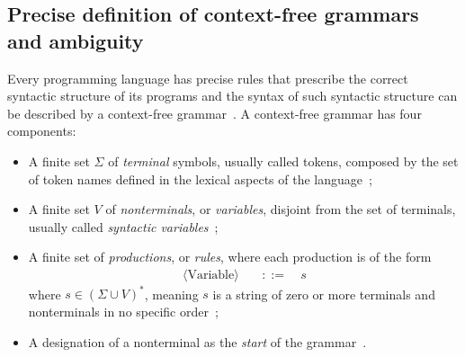 \documentclass[
  oneside,
  english,
  coorientadorbanca,
  embeddedlogo,
  noabntexcite
]{ufsc-thesis-rn46-2019}
\newcommand{\bnfvars}[1]{\langle\textrm{#1}\rangle}
\newcommand{\bnfprod}[2]{\bnfvars{#1} &\ &::= & #2}
\begin{document}
\subsection{Precise definition of context-free grammars and ambiguity}
Every programming language has precise rules that prescribe the correct syntactic structure of its programs and the syntax of such syntactic structure can be described by a context-free grammar~\cite{Aho:2006:CPT:1177220}.
A context-free grammar has four components:
\begin{itemize}
  \item A finite set $\Sigma$ of \textit{terminal} symbols, usually called tokens, composed by the set of token names defined in the lexical aspects of the language~\cite{Aho:2006:CPT:1177220};
  \item A finite set $V$ of \textit{nonterminals}, or \textit{variables}, disjoint from the set of terminals, usually called \textit{syntactic variables}~\cite{Aho:2006:CPT:1177220};
  \item A finite set of \textit{productions}, or \textit{rules}, where each production is of the form
        \begin{equation*}
          \begin{alignedat}{2}
            \bnfprod{Variable}{\ s}
          \end{alignedat}
        \end{equation*}
        where $s \in {(\Sigma \cup V)}^*$, meaning $s$ is a string of zero or more terminals and nonterminals in no specific order~\cite{Aho:2006:CPT:1177220, sipser2012introduction};
  \item A designation of a nonterminal as the \textit{start} of the grammar~\cite{Aho:2006:CPT:1177220}.
\end{itemize}
\end{document}
